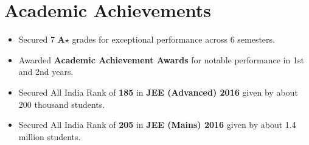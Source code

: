 \section*{Academic Achievements}
\begin{itemize}

\setlength\itemsep{0pt}
\item Secured 7 \textbf{A$\star$} grades for exceptional performance across 6 semesters.
\item Awarded \textbf{Academic Achievement Awards} for notable performance in 1st and 2nd years.
\item Secured All India Rank of {\bf 185} in {\bf JEE (Advanced) 2016} given by about 200 thousand students.
\item Secured All India Rank of {\bf 205} in {\bf JEE (Mains) 2016} given by about 1.4 million students.

\end{itemize}
